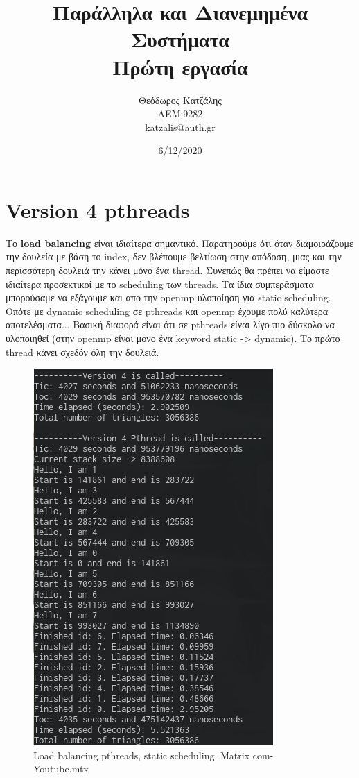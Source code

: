 \documentclass[12pt, a4paper]{article}
\title{\textbf{Παράλληλα και Διανεμημένα Συστήματα \\ Πρώτη εργασία}}
\author{Θεόδωρος Κατζάλης \\ ΑΕΜ:9282 \\ katzalis@auth.gr}
\date{6/12/2020}
\begin{document}
\sloppy
%
\maketitle


\tableofcontents


\section{Version 4 pthreads}

Το \textbf{load balancing} είναι ιδιαίτερα σημαντικό. Παρατηρούμε ότι όταν διαμοιράζουμε την δουλεία με βάση το index, δεν βλέπουμε βελτίωση στην απόδοση, μιας και την περισσότερη δουλειά την κάνει μόνο ένα thread. Συνεπώς θα πρέπει να είμαστε ιδιαίτερα προσεκτικοί με το scheduling των threads. Τα ίδια συμπεράσματα μπορούσαμε να εξάγουμε και απο την openmp υλοποίηση για static scheduling. Οπότε με dynamic scheduling σε pthreads και openmp έχουμε πολύ καλύτερα αποτελέσματα... Βασική διαφορά είναι ότι σε pthreads είναι λίγο πιο δύσκολο να υλοποιηθεί (στην openmp είναι μονο ένα keyword static -> dynamic). Το πρώτο thread κάνει σχεδόν όλη την δουλειά.

\begin{figure}[h!]
\centering
	\includegraphics[height=.3\textheight, width=\textwidth, keepaspectratio]{assets/load_pthreads.png}
    \caption{Load balancing pthreads, static scheduling. Matrix com-Youtube.mtx}
\end{figure}
\end{document}
